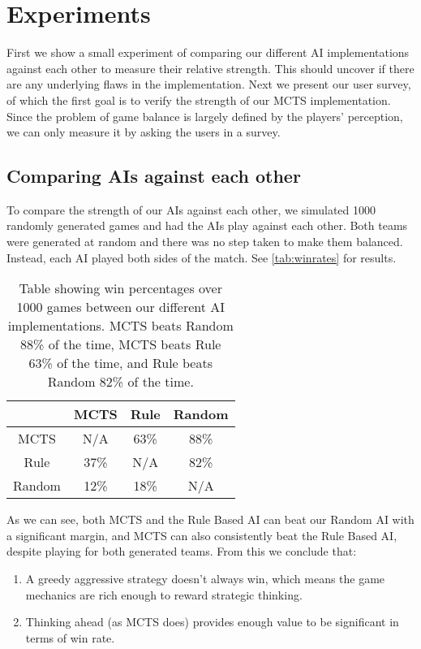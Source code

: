 \chapter{Experiments}
\label{chapter05}

First we show a small experiment of comparing our different AI implementations against each other to measure their relative strength. This should uncover if there are any underlying flaws in the implementation. Next we present our user survey, of which the first goal is to verify the strength of our MCTS implementation. Since the problem of game balance is largely defined by the players' perception, we can only measure it by asking the users in a survey.

\section{Comparing AIs against each other}

To compare the strength of our AIs against each other, we simulated 1000 randomly generated games
and had the AIs play against each other. Both teams were generated at random and there was no step taken
to make them balanced. Instead, each AI played both sides of the match. See \autoref{tab:winrates} for results.

\begin{table}[h]
	\centering
	\begin{tabular}{|| c | c c c ||}
		\hline
		& MCTS & Rule & Random \\
		\hline\hline
		MCTS & N/A & 63\% & 88\% \\
		Rule & 37\%& N/A & 82\% \\
		Random & 12\% & 18\% & N/A \\
		\hline
	\end{tabular}
	\caption{Table showing win percentages over 1000 games between our different AI implementations.
	MCTS beats Random 88\% of the time, MCTS beats Rule 63\% of the time, and Rule beats Random 82\% of the time.}
	\label{tab:winrates}
\end{table}

As we can see, both MCTS and the Rule Based AI can beat our Random AI with a significant margin,
and MCTS can also consistently beat the Rule Based AI, despite playing for both generated teams.
From this we conclude that:

\begin{enumerate}
	\item A greedy aggressive strategy doesn't always win, which means the game mechanics are rich enough
	to reward strategic thinking.
	\item Thinking ahead (as MCTS does) provides enough value to be significant in terms of win rate.
\end{enumerate}

